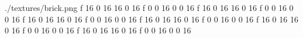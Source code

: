 ./textures/brick.png
f 16 0 16 16 0 16
f 0 0 16 0 0 16
f 16 0 16 16 0 16
f 0 0 16 0 0 16
f 16 0 16 16 0 16
f 0 0 16 0 0 16
f 16 0 16 16 0 16
f 0 0 16 0 0 16
f 16 0 16 16 0 16
f 0 0 16 0 0 16
f 16 0 16 16 0 16
f 0 0 16 0 0 16
